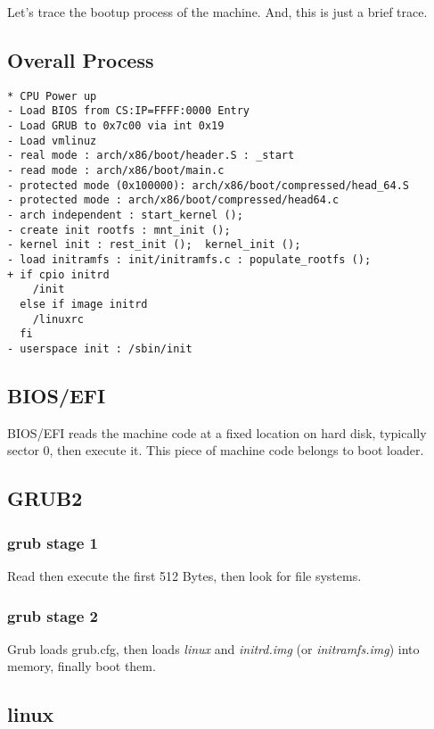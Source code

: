 Let's trace the bootup process of the machine.\newline
And, this is just a brief trace.
\subsection{Overall Process}
\begin{verbatim}
* CPU Power up
- Load BIOS from CS:IP=FFFF:0000 Entry
- Load GRUB to 0x7c00 via int 0x19
- Load vmlinuz
- real mode : arch/x86/boot/header.S : _start
- read mode : arch/x86/boot/main.c
- protected mode (0x100000): arch/x86/boot/compressed/head_64.S
- protected mode : arch/x86/boot/compressed/head64.c
- arch independent : start_kernel ();
- create init rootfs : mnt_init ();
- kernel init : rest_init ();  kernel_init ();
- load initramfs : init/initramfs.c : populate_rootfs ();
+ if cpio initrd
    /init
  else if image initrd
    /linuxrc
  fi
- userspace init : /sbin/init
\end{verbatim}

\subsection{BIOS/EFI}
BIOS/EFI reads the machine code at a fixed location on hard disk, typically sector 0, then execute it.\newline
This piece of machine code belongs to boot loader.
\subsection{GRUB2}
\subsubsection{grub stage 1}
Read then execute the first 512 Bytes, then look for file systems.
\subsubsection{grub stage 2}
Grub loads grub.cfg, then loads \emph{linux} and \emph{initrd.img} (or \emph{initramfs.img}) into memory, finally boot them.
\subsection{linux}
